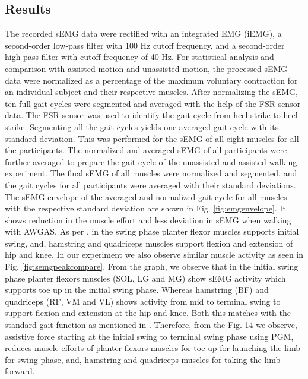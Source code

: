 \documentclass[paper,JRM,paper]{jaciiiarticle}
\begin{document}
\subsection{Results}\label{evalresult}
The recorded sEMG data were rectified with an integrated EMG (iEMG), a second-order low-pass filter with 100 Hz cutoff frequency, and a second-order high-pass filter with cutoff frequency of 40 Hz. For statistical analysis and comparison with assisted motion and unassisted motion, the processed sEMG data were normalized as a percentage of the maximum voluntary contraction for an individual subject and their respective muscles. After normalizing the sEMG, ten full gait cycles were segmented and averaged with the help of the FSR sensor data. The FSR sensor was used to identify the gait cycle from heel strike to heel strike. Segmenting all the gait cycles yields one averaged gait cycle with its standard deviation. This was performed for the sEMG of all eight muscles for all the participants. The normalized and averaged sEMG of all participants were further averaged to prepare the gait cycle of the unassisted and assisted walking experiment. The final sEMG of all muscles were normalized and segmented, and the gait cycles for all participants were averaged with their standard deviations.
The sEMG envelope of the averaged and normalized gait cycle for all muscles with the respective standard deviation are shown in Fig. \ref{fig:emgenvelope}. It shows reduction in the muscle effort and less deviation in sEMG when walking with AWGAS. 
As per \cite{15}, in the swing phase planter flexor muscles supports initial swing, and, hamstring and quadriceps muscles support flexion and extension of hip and knee. In our experiment we also observe similar muscle activity as seen in Fig. \ref{fig:semgpeakcompare}. From the graph, we observe that in the initial swing phase planter flexors muscles (SOL, LG and MG) show sEMG activity which supports toe up in the initial swing phase. Whereas hamstring (BF) and quadriceps (RF, VM and VL) shows activity from mid to terminal swing to support flexion and extension at the hip and knee. Both this matches with the standard gait function as mentioned in \cite{15}.
Therefore, from the Fig. 14 we observe, assistive force starting at the initial swing to terminal swing phase using PGM, reduces muscle efforts of planter flexors muscles for toe up for launching the limb for swing phase, and, hamstring and quadriceps muscles for taking the limb forward.
\end{document}
